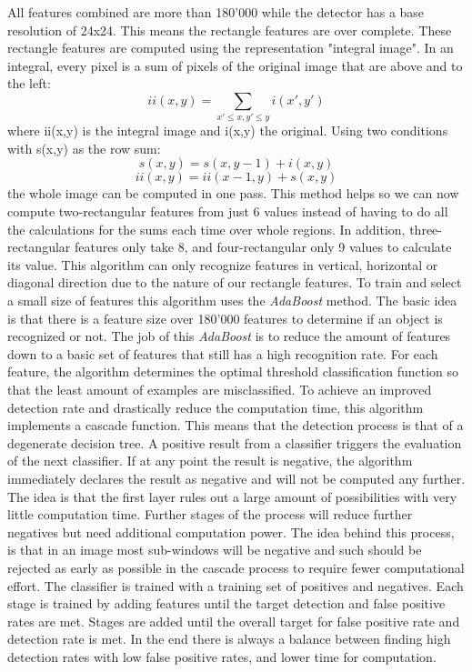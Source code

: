 All features combined are more than 180'000 while the detector has a base resolution of 24x24. This means the rectangle features are over complete.
These rectangle features are computed using the representation "integral image". In an integral, every pixel is a sum of pixels of the original image that are above and to the left:
\begin{equation}ii(x,y) = \sum_{x'\leq x, y'\leq y} i(x',y')\end{equation}
where ii(x,y) is the integral image and i(x,y) the original. Using two conditions with s(x,y) as the row sum:
\begin{equation}s(x,y) = s(x,y-1)+i(x,y)\end{equation}
\begin{equation}ii(x,y) = ii(x-1,y)+s(x,y)\end{equation}
the whole image can be computed in one pass.
This method helps so we can now compute two-rectangular features from just 6 values instead of having to do all the calculations for the sums each time over whole regions. In addition, three-rectangular features only take 8, and four-rectangular only 9 values to calculate its value. This algorithm can only recognize features in vertical, horizontal or diagonal direction due to the nature of our rectangle features.
To train and select a small size of features this algorithm uses the \textit{AdaBoost} method. The basic idea is that there is a feature size over 180'000 features to determine if an object is recognized or not. The job of this \textit{AdaBoost} is to reduce the amount of features down to a basic set of features that still has a high recognition rate. For each feature, the algorithm determines the optimal threshold classification function so that the least amount of examples are misclassified.
To achieve an improved detection rate and drastically reduce the computation time, this algorithm implements a cascade function. This means that the detection process is that of a degenerate decision tree. A positive result from a classifier triggers the evaluation of the next classifier. If at any point the result is negative, the algorithm immediately declares the result as negative and will not be computed any further. The idea is that the first layer rules out a large amount of possibilities with very little computation time. Further stages of the process will reduce further negatives but need additional computation power. The idea behind this process, is that in an image most sub-windows will be negative and such should be rejected as early as possible in the cascade process to require fewer computational effort.
The classifier is trained with a training set of positives and negatives. Each stage is trained by adding features until the target detection and false positive rates are met. Stages are added until the overall target for false positive rate and detection rate is met. In the end there is always a balance between finding high detection rates with low false positive rates, and lower time for computation.

